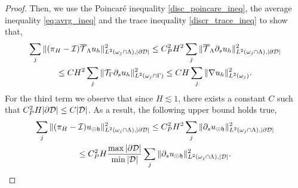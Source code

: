 \documentclass[r]{siamart171218}
\newcommand{\paolo}[1]{{\color{magenta}#1}}
\begin{document}
\begin{proof}
Then, we use the Poincar\'e inequality \eqref{disc_poincare_ineq}, the average inequality \eqref{eq:avrg_ineq} and the trace inequality \eqref{discr_trace_ineq} to show that,
\begin{multline*}
\sum _j  \|(\pi_H - \mathcal{I}){\overline{\mathcal{T}}_\Lambda} u_h\|^2_{L^2(\omega _j\cap \Lambda),|\partial\mathcal{D}|} 
\leq C_P^2 H^2 \sum _j \|{\overline{\mathcal{T}}_\Lambda} \partial_s  u_h\|_{L^2(\omega _j\cap \Lambda),|\partial\mathcal{D}|}^2
\\
\leq C H^2 \sum _j \|{\mathcal{T}_\Gamma} \partial_s u_h\|_{L^2(\omega _j \cap \Gamma)}^2
\leq C H \sum _j \|\nabla u_h\|_{L^2(\omega _j)}^2.
\end{multline*}
\paolo{For the third term we observe that since $H \lesssim 1$, there exists a constant $C$ 
such that $C_P^2 H|\partial\mathcal{D}| \leq C |\mathcal{D}|$. As a result, the following upper bound holds true,
\begin{multline*}
\sum _j \|(\pi_H - \mathcal{I})u_{\odot \mathfrak{h}}\|^2_{L^2(\omega _j\cap \Lambda),|\partial\mathcal{D}|} \leq C_P^2 H^2 \sum _j \|\partial_s u_{\odot \mathfrak{h}}\|_{L^2(\omega _j\cap \Lambda),|\partial\mathcal{D}|}^2
\\
\leq C_P^2 H \frac{\max |\partial\mathcal{D}|}{\min |\mathcal{D}|} \sum _j \|\partial_s u_{\odot \mathfrak{h}}\|_{L^2(\omega _j\cap \Lambda),|\mathcal{D}|}^2.
\end{multline*}
}
\end{proof}
\end{document}
